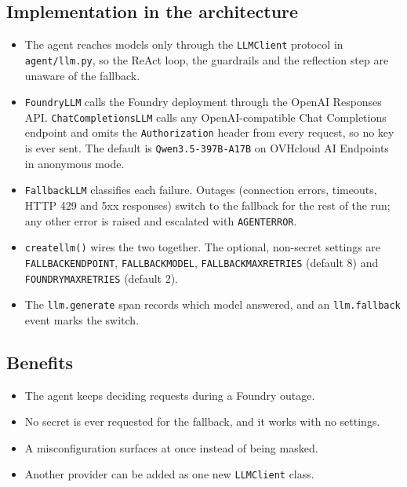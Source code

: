 \documentclass[11pt,letterpaper]{article}
\renewcommand{\_}{\textunderscore\allowbreak}
\begin{document}
\subsection*{Implementation in the architecture}
\begin{itemize}
  \item The agent reaches models only through the \texttt{LLMClient} protocol in
  \texttt{agent/llm.py}, so the ReAct loop, the guardrails and the reflection step are unaware of
  the fallback.
  \item \texttt{FoundryLLM} calls the Foundry deployment through the OpenAI Responses API.
  \texttt{ChatCompletionsLLM} calls any OpenAI-compatible Chat Completions endpoint and omits the
  \texttt{Authorization} header from every request, so no key is ever sent. The default is
  \texttt{Qwen3.5-397B-A17B} on OVHcloud AI Endpoints in anonymous mode.
  \item \texttt{FallbackLLM} classifies each failure. Outages (connection errors, timeouts,
  HTTP 429 and 5xx responses) switch to the fallback for the rest of the run; any other error is
  raised and escalated with \texttt{AGENT\_ERROR}.
  \item \texttt{create\_llm()} wires the two together. The optional, non-secret settings are
  \texttt{FALLBACK\_ENDPOINT}, \texttt{FALLBACK\_MODEL}, \texttt{FALLBACK\_MAX\_RETRIES}
  (default 8) and \texttt{FOUNDRY\_MAX\_RETRIES} (default 2).
  \item The \texttt{llm.generate} span records which model answered, and an
  \texttt{llm.fallback} event marks the switch.
\end{itemize}

\subsection*{Benefits}
\begin{itemize}
  \item The agent keeps deciding requests during a Foundry outage.
  \item No secret is ever requested for the fallback, and it works with no settings.
  \item A misconfiguration surfaces at once instead of being masked.
  \item Another provider can be added as one new \texttt{LLMClient} class.
\end{itemize}
\end{document}
